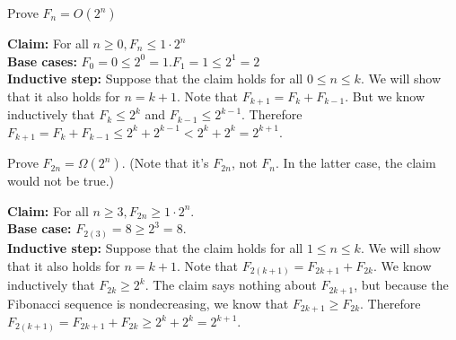 \documentclass[12pt]{article}
\begin{document}
Prove $F_{n}=O(2^{n})$ 
\begin{tcolorbox}
\textbf{Claim:} For all $n \geq 0, F_{n} \leq 1 \cdot 2^{n}$ \\
\textbf{Base cases:} $F_{0}=0 \leq 2^{0}=1 . F_{1}=1 \leq 2^{1}=2$ \\
\textbf{Inductive step:} Suppose that the claim holds for all $0 \leq n \leq k$. We will show that it also holds for $n=k+1 .$ Note that $F_{k+1}=F_{k}+F_{k-1}$. But we know inductively that $F_{k} \leq 2^{k}$ and $F_{k-1} \leq 2^{k-1}$. Therefore $F_{k+1}=F_{k}+F_{k-1} \leq 2^{k}+2^{k-1}<2^{k}+2^{k}=2^{k+1}$.
\end{tcolorbox}
Prove $F_{2 n}=\Omega\left(2^{n}\right)$. (Note that it's $F_{2 n}$, not $F_{n}$. In the latter case, the claim would not be true.)
\begin{tcolorbox}
\textbf{Claim:} For all $n \geq 3, F_{2 n} \geq 1 \cdot 2^{n}$. \\
\textbf{Base case:} $F_{2(3)}=8 \geq 2^{3}=8$. \\
\textbf{Inductive step:} Suppose that the claim holds for all $1 \leq n \leq k$. We will show that it also holds for $n=k+1$.
Note that $F_{2(k+1)}=F_{2 k+1}+F_{2 k}$. We know inductively that $F_{2 k} \geq 2^{k}$. The claim says nothing about $F_{2 k+1}$, but because the Fibonacci sequence is nondecreasing, we know that $F_{2 k+1} \geq F_{2 k}$. Therefore $F_{2(k+1)}=F_{2 k+1}+F_{2 k} \geq 2^{k}+2^{k}=2^{k+1}$.
\end{tcolorbox}
\end{document}
